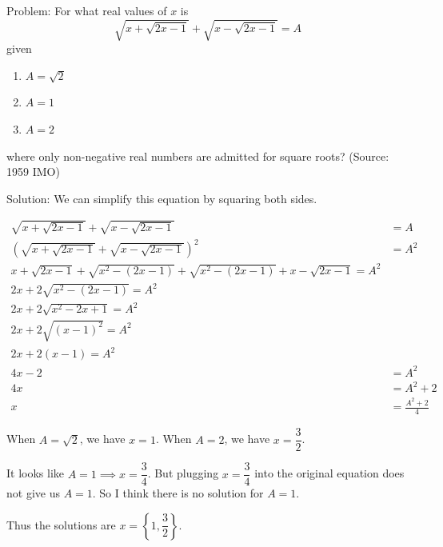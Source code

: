Problem: For what real values of $x$ is $$\sqrt{x + \sqrt{2x-1}} + \sqrt{x - \sqrt{2x-1}} = A$$ given 

\begin{enumerate}
\item $A = \sqrt{2}$
\item $A = 1$
\item $A = 2$
\end{enumerate}

where only non-negative real numbers are admitted for square roots? (Source: 1959 IMO)

Solution: We can simplify this equation by squaring both sides.

\begin{align*}
\sqrt{x + \sqrt{2x-1}} + \sqrt{x - \sqrt{2x-1}} &= A \\
\left(\sqrt{x + \sqrt{2x-1}} + \sqrt{x - \sqrt{2x-1}}\right)^2 &= A^2 \\
x + \sqrt{2x-1} + \sqrt{x^2 - (2x - 1)} + \sqrt{x^2 - (2x - 1)} + x - \sqrt{2x-1} = A^2 \\
2x + 2\sqrt{x^2 - (2x - 1)} = A^2 \\
2x + 2\sqrt{x^2 - 2x + 1} = A^2 \\
2x + 2\sqrt{(x-1)^2} = A^2 \\
2x + 2(x-1) = A^2 \\
4x - 2 &= A^2 \\
4x &= A^2 + 2 \\
x &= \frac{A^2 + 2}{4}
\end{align*}

When $A = \sqrt{2}$, we have $x = 1$. When $A = 2$, we have $x = \dfrac{3}{2}$.

It looks like $A = 1 \implies x = \dfrac{3}{4}$. But plugging $x = \dfrac{3}{4}$ into the original equation does not give us $A = 1$. So I think there is no solution for $A = 1$.

Thus the solutions are $x = \left\{1, \dfrac{3}{2} \right\}$.
